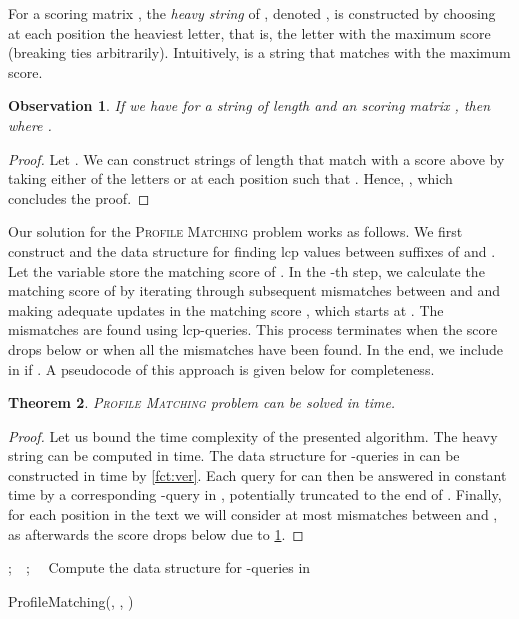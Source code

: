 \documentclass{article}
\theoremstyle{plain}
\newtheorem{theorem}{Theorem}[section]
\newtheorem{observation}[theorem]{Observation}
\theoremstyle{definition}
\newcommand{\PM}{\textsc{Profile Matching}\xspace}
\newcommand{\mayqed}{}
\begin{document}
    For a scoring matrix , the \emph{heavy string} of , denoted ,
    is constructed by choosing at each position the heaviest letter, that is,
    the letter with the maximum score (breaking ties arbitrarily).
    Intuitively,  is a string that matches  with the maximum score.

    \begin{observation}\label{obs:crucial_profile}
      If we have  for a string  of length  and an  scoring matrix ,
      then  where .
    \end{observation}
    \begin{proof}
      Let .
      We can construct  strings of length  that match  with a score above 
      by taking either of the letters  or  at each position  such that .
      Hence, , which concludes the proof.
    \mayqed\end{proof}

    Our solution for the \PM problem works as follows.
    We first construct  and the data structure for finding lcp values between suffixes of  and .
    Let the variable  store the matching score of .
    In the -th step, we calculate the matching score of  by iterating through
    subsequent mismatches between  and  and making adequate updates in the matching score , which
    starts at .
    The mismatches are found using lcp-queries.
    This process terminates when the score  drops below  or when all the mismatches have been found.
    In the end, we include  in  if .
    A pseudocode of this approach is given below for completeness.

    \begin{theorem}
      \PM problem can be solved in  time.
    \end{theorem}
    \begin{proof}
      Let us bound the time complexity of the presented algorithm.
      The heavy string  can be computed in  time.
      The data structure for -queries in  can be constructed in  time by \cref{fct:ver}.
      Each query for  can then be answered in constant time by a corresponding -query
      in , potentially truncated to the end of .
      Finally, for each position  in the text  we will consider at most  mismatches between  and ,
      as afterwards the score  drops below  due to \cref{obs:crucial_profile}.
    \mayqed\end{proof}

      \begin{procedure}[htpb]
      ;\ \ ;\ \ \;
      \;
      Compute the data structure for -queries in \;
      \;
      \Return{}\;
      \caption{ProfileMatching(, , )}
    \end{procedure}
    
\end{document}

